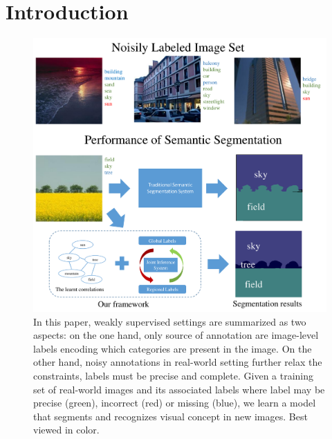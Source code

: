 \section{Introduction}

\begin{figure}[t]
\begin{center}
    \includegraphics[width=1\linewidth]{fig_noisyparsing.pdf}
\end{center}
    \caption{In this paper, weakly supervised settings are summarized as two aspects: on the one hand, only source of annotation are image-level labels encoding which categories are present in the image. On the other hand, noisy annotations in real-world setting further relax the constraints, labels must be precise and complete. Given a training set of real-world images and its associated labels where label may be precise (green), incorrect (red) or missing (blue), we learn a model that segments and recognizes visual concept in new images. Best viewed in color.}
\label{fig:noisyparsing}
\end{figure}

